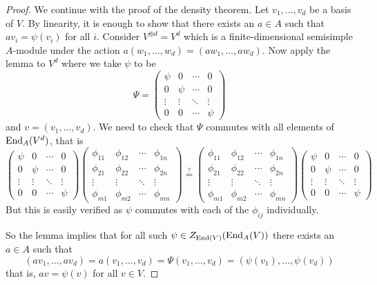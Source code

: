 \begin{proof}
    We continue with the proof of the density theorem.
    Let $v_1,\ldots,v_d$ be a basis of $V$.
    By linearity, it is enough to show that there exists an $a \in A$ such that $av_i = \psi(v_i)$ for all $i$.
    Consider $V^{\oplus d} = V^d$ which is a finite-dimensional semisimple $A$-module under the action $a(w_1,\ldots,w_d) = (aw_1,\ldots,aw_d)$.
    Now apply the lemma to $V^d$ where we take $\psi$ to be
    \[
    	\Psi=
    	\begin{pmatrix}
        	\psi & 0 & \cdots & 0 \\
            0 & \psi & \cdots & 0 \\
            \vdots & \vdots & \ddots & \vdots \\
            0 & 0 & \cdots & \psi
        \end{pmatrix}
    \]
    and $v = (v_1,\ldots,v_d)$.
    We need to check that $\Psi$ commutes with all elements of $\operatorname{End}_A(V^d)$, that is
    \[
    	\begin{pmatrix}
        	\psi & 0 & \cdots & 0 \\
            0 & \psi & \cdots & 0 \\
            \vdots & \vdots & \ddots & \vdots \\
            0 & 0 & \cdots & \psi
        \end{pmatrix}
        \begin{pmatrix}
            \phi_{11} & \phi_{12} & \cdots & \phi_{1n} \\
            \phi_{21} & \phi_{22} & \cdots & \phi_{2n} \\
            \vdots & \vdots & \ddots & \vdots \\
            \phi_{m1} & \phi_{m2} & \cdots & \phi_{mn}
    	\end{pmatrix}
    	\overset{?}{=}
        \begin{pmatrix}
            \phi_{11} & \phi_{12} & \cdots & \phi_{1n} \\
            \phi_{21} & \phi_{22} & \cdots & \phi_{2n} \\
            \vdots & \vdots & \ddots & \vdots \\
            \phi_{m1} & \phi_{m2} & \cdots & \phi_{mn}
    	\end{pmatrix}
        \begin{pmatrix}
        	\psi & 0 & \cdots & 0 \\
            0 & \psi & \cdots & 0 \\
            \vdots & \vdots & \ddots & \vdots \\
            0 & 0 & \cdots & \psi
        \end{pmatrix}
    \]
    But this is easily verified as $\psi$ commutes with each of the $\phi_{ij}$ individually.
    
    So the lemma implies that for all such $\psi \in Z_{\operatorname{End}(V)}(\operatorname{End}_A(V))$ there exists an $a \in A$ such that 
    \[(av_1,\ldots,av_d) = a(v_1,\ldots,v_d) = \Psi (v_1,\ldots,v_d) = (\psi(v_1),\ldots,\psi(v_d))\]
    that is, $av = \psi(v)$ for all $v \in V$.
\end{proof}

